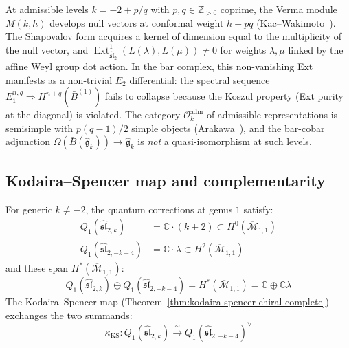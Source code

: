 \begin{remark}\label{rem:sl2-admissible}
At admissible levels $k = -2 + p/q$ with $p, q \in \mathbb{Z}_{>0}$ coprime, the Verma module $M(k, h)$ develops null vectors at conformal weight $h + pq$ (Kac--Wakimoto~\cite{KW88}).  The Shapovalov form acquires a kernel of dimension equal to the multiplicity of the null vector, and $\operatorname{Ext}^1_{\widehat{\mathfrak{sl}}_2}(L(\lambda), L(\mu)) \neq 0$ for weights $\lambda, \mu$ linked by the affine Weyl group dot action.  In the bar complex, this non-vanishing Ext manifests as a non-trivial $E_2$ differential: the spectral sequence $E_1^{n,q} \Rightarrow H^{n+q}(\bar{B}^{(1)})$ fails to collapse because the Koszul property (Ext purity at the diagonal) is violated.  The category $\mathcal{O}_k^{\mathrm{adm}}$ of admissible representations is semisimple with $p(q-1)/2$ simple objects (Arakawa~\cite{Arakawa17}), and the bar-cobar adjunction $\Omega(\bar{B}(\widehat{\mathfrak{g}}_k)) \to \widehat{\mathfrak{g}}_k$ is \emph{not} a quasi-isomorphism at such levels.
\end{remark}

\subsection{Kodaira--Spencer map and complementarity}

\begin{theorem}
\label{thm:sl2-genus1-complementarity}
For generic $k \neq -2$, the quantum corrections at genus $1$ satisfy:
\begin{align}
Q_1(\widehat{\mathfrak{sl}}_{2,k}) &= \mathbb{C} \cdot (k+2) \subset H^0(\overline{\mathcal{M}}_{1,1}) \label{eq:Q1-sl2} \\
Q_1(\widehat{\mathfrak{sl}}_{2,-k-4}) &= \mathbb{C} \cdot \lambda \subset H^2(\overline{\mathcal{M}}_{1,1}) \label{eq:Q1-sl2-dual}
\end{align}
and these span $H^*(\overline{\mathcal{M}}_{1,1})$:
\begin{equation}\label{eq:sl2-complementarity}
Q_1(\widehat{\mathfrak{sl}}_{2,k}) \oplus Q_1(\widehat{\mathfrak{sl}}_{2,-k-4}) = H^*(\overline{\mathcal{M}}_{1,1}) = \mathbb{C} \oplus \mathbb{C}\lambda
\end{equation}
The Kodaira--Spencer map (Theorem~\ref{thm:kodaira-spencer-chiral-complete}) exchanges the two summands:
\begin{equation}
\kappa_{\mathrm{KS}}: Q_1(\widehat{\mathfrak{sl}}_{2,k}) \xrightarrow{\;\sim\;} Q_1(\widehat{\mathfrak{sl}}_{2,-k-4})^\vee
\end{equation}
\end{theorem}

